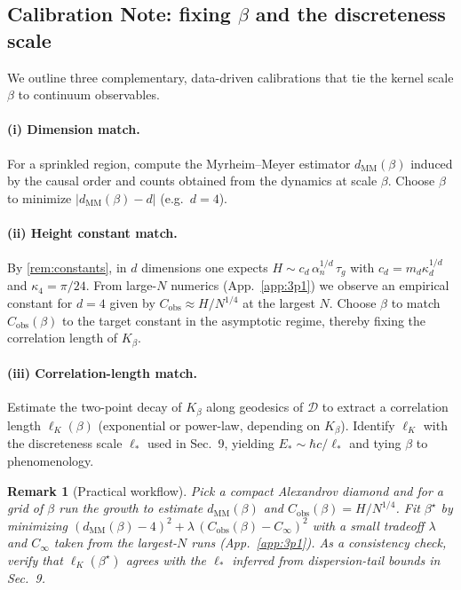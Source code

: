 \documentclass[12pt,a4paper]{article}
\newtheorem{remark}{Remark}
\begin{document}
\subsection{Calibration Note: fixing $\beta$ and the discreteness scale}\label{subsec:calibration}
We outline three complementary, data-driven calibrations that tie the kernel scale $\beta$ to continuum observables.

\paragraph{(i) Dimension match.} For a sprinkled region, compute the Myrheim--Meyer estimator $d_{\mathrm{MM}}(\beta)$ induced by the causal order and counts obtained from the dynamics at scale $\beta$. Choose $\beta$ to minimize $|d_{\mathrm{MM}}(\beta)-d|$ (e.g.\ $d=4$).

\paragraph{(ii) Height constant match.} By \cref{rem:constants}, in $d$ dimensions one expects
$H \sim c_d\, \alpha_n^{1/d}\,\tau_g$ with $c_d=m_d \kappa_d^{1/d}$ and $\kappa_4=\pi/24$. From large-$N$ numerics (App.~\ref{app:3p1}) we observe an empirical constant for $d=4$ given by $C_{\text{obs}} \approx H/N^{1/4}$ at the largest $N$. Choose $\beta$ to match $C_{\text{obs}}(\beta)$ to the target constant in the asymptotic regime, thereby fixing the correlation length of $K_\beta$.

\paragraph{(iii) Correlation-length match.} Estimate the two-point decay of $K_\beta$ along geodesics of $\mathcal{D}$ to extract a correlation length $\ell_K(\beta)$ (exponential or power-law, depending on $K_\beta$). Identify $\ell_K$ with the discreteness scale $\ell_*$ used in Sec.~9, yielding $E_*\sim \hbar c/\ell_*$ and tying $\beta$ to phenomenology.

\begin{remark}[Practical workflow]
Pick a compact Alexandrov diamond and for a grid of $\beta$ run the growth to estimate $d_{\mathrm{MM}}(\beta)$ and $C_{\text{obs}}(\beta)=H/N^{1/4}$. Fit $\beta^\star$ by minimizing
\(
(d_{\mathrm{MM}}(\beta)-4)^2 + \lambda\,(C_{\text{obs}}(\beta)-C_\infty)^2
\)
with a small tradeoff $\lambda$ and $C_\infty$ taken from the largest-$N$ runs (App.~\ref{app:3p1}). As a consistency check, verify that $\ell_K(\beta^\star)$ agrees with the $\ell_*$ inferred from dispersion-tail bounds in Sec.~9.
\end{remark}
\end{document}
